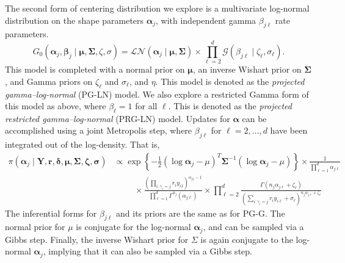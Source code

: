 The second form of centering distribution we explore is a multivariate log-normal distribution on the shape parameters $\bm{\alpha}_j$, with independent gamma $\beta_{j\ell}$ rate parameters.  
    \begin{equation}
        G_0\left(\bm{\alpha}_j,\bm{\beta}_j\mid\bm{\mu},\bm{\Sigma},\zeta,\sigma\right)
        =\mathcal{LN}\left(\bm{\alpha}_j\mid\bm{\mu},\bm{\Sigma}\right)\times\prod_{\ell = 2}^d\mathcal{G}\left(\beta_{j\ell}\mid\zeta_{\ell},\sigma_{\ell}\right).
    \end{equation}
    This model is completed with a normal prior on $\bm{\mu}$, an inverse Wishart prior on
    $\bm{\Sigma}$, and Gamma priors on $\zeta_{\ell}$ and $\sigma_{\ell}$, and $\eta$.  
    This model is denoted as the \emph{projected gamma--log-normal} (PG-LN) model.  
    We also explore a restricted Gamma form of this model as above, where 
    $\beta_{\ell} = 1$ for all $\ell$.  This is denoted as the 
    \emph{projected restricted gamma--log-normal} (PRG-LN) model.  Updates for 
    $\bm{\alpha}$ can be accomplished using a joint Metropolis step, where 
    $\beta_{j\ell}$ for $\ell = 2,\ldots,d$ have been integrated out of the 
    log-density.  That is,
    \[
        \begin{aligned}
        \pi(\bm{\alpha}_j\mid\bm{Y},\bm{r},\bm{\delta},\bm{\mu},\bm{\Sigma},\bm{\zeta},\bm{\sigma})
        &\propto \exp\left\lbrace-\frac{1}{2}(\log\bm{\alpha}_j - \mu)^T\bm{\Sigma}^{-1}(\log\bm{\alpha}_j - \mu)\right\rbrace
        \times\frac{1}{\prod_{\ell = 1}^d\alpha_{j\ell}}\\
        &\hspace{1cm}\times \frac{\left(\prod_{i:\gamma_i = j}r_iy_{i1}\right)^{\alpha_{j1} - 1}}{\prod_{\ell = 1}^d\Gamma^{n_j}(\alpha_{j\ell})}
        \times \prod_{\ell = 2}^d\frac{\Gamma\left(n_j\alpha_{j\ell} + \zeta_{\ell}\right)}{\left(\sum_{i:\gamma_i = j}r_iy_{i\ell} + \sigma_{\ell}\right)^{n_j\alpha_{j\ell} + \zeta_{\ell}}}
        \end{aligned}
    \]
    The inferential forms for $\beta_{j\ell}$ and its priors are the same as for PG-G.  The 
  normal prior for $\mu$ is conjugate for the log-normal $\bm{\alpha}_j$, and can be sampled
  via a Gibbs step.  Finally, the inverse Wishart prior for $\Sigma$ is again conjugate to
  the log-normal $\bm{\alpha}_j$, implying that it can also be sampled via a Gibbs step.

